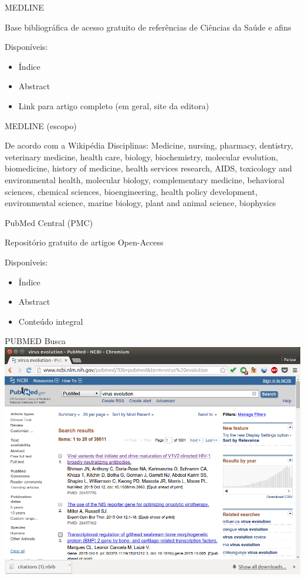 \documentclass{beamer}
\begin{document}
\begin{frame}{MEDLINE}
  \begin{definition}
    Base bibliográfica de acesso gratuito de referências de Ciências
    da Saúde e afins
  \end{definition}
  Disponíveis:
  \begin{itemize}
  \item Índice
  \item Abstract
  \item Link para artigo completo (em geral, site da editora)
  \end{itemize}
\end{frame}

\begin{frame}{MEDLINE (escopo)}
  \begin{block}{De acordo com a Wikipédia}
    Disciplinas: Medicine, nursing, pharmacy, dentistry, veterinary
    medicine, health care, biology, biochemistry, molecular evolution,
    biomedicine, history of medicine, health services research, AIDS,
    toxicology and environmental health, molecular biology,
    complementary medicine, behavioral sciences, chemical sciences,
    bioengineering, health policy development, environmental science,
    marine biology, plant and animal science, biophysics
  \end{block}
\end{frame}

\begin{frame}{PubMed Central (PMC)}
  \begin{definition}
    Repositório gratuito de artigos Open-Access
  \end{definition}
  Disponíveis:
  \begin{itemize}
  \item Índice
  \item Abstract
  \item Conteúdo integral
  \end{itemize}
\end{frame}

\begin{frame}{PUBMED Busca}
  \includegraphics[height=.85\textheight]{Busca/pubmed-busca}
\end{frame}
\end{document}
